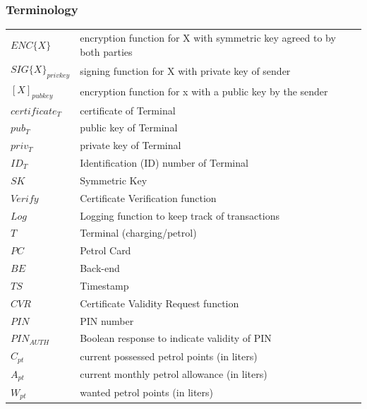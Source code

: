 \subsubsection{Terminology}
    \begin{tabular}{*{2}{l}}
        $ENC\{X\}$ & encryption function for X with symmetric key agreed to by both parties\\
        $SIG\{X\}_{privkey}$ & signing function for X with private key of sender \\
        $[X]_{pubkey}$ & encryption function for x with a public key by the sender \\
        $certificate_{T}$ & certificate of Terminal \\
        $pub_{T}$ & public key of Terminal \\
        $priv_{T}$ & private key of Terminal  \\
        $ID_{T}$ & Identification (ID) number of Terminal \\
        $SK$ & Symmetric Key \\
        $Verify$ & Certificate Verification function \\
        $Log$ & Logging function to keep track of transactions \\
        $T$ & Terminal (charging/petrol) \\
        $PC$ & Petrol Card \\
        $BE$ & Back-end \\
        $TS$ & Timestamp \\
        $CVR$ & Certificate Validity Request function \\
        $PIN$ & PIN number \\
        $PIN_{AUTH}$ & Boolean response to indicate validity of PIN \\
        $C_{pt}$ & current possessed petrol points (in liters) \\
        $A_{pt}$ & current monthly petrol allowance (in liters) \\
        $W_{pt}$ & wanted petrol points (in liters) \\
	\end{tabular}

